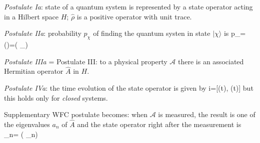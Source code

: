 \documentclass[12pt]{article}
\begin{document}
\emph{Postulate Ia}: state of a quantum system is represented
by a state operator acting in a Hilbert space $H$;
\(\hat{\rho}\) is a positive operator with unit trace.


\emph{Postulate IIa}: probability $p_{\chi}$ of finding the quantum
systen in state $|\chi\rangle$ is 
\be
p_{\chi}=\Tr(\hat{\rho}\op{\chi})=\Tr\left(\hat{\rho} _{\chi}\right)
\ee


\emph{Postulate IIIa} =  Postulate III: to a physical property
$\mathcal{A}$ there is an associated Hermitian operator \(\hat{A}\)
in $H$.

\emph{Postulate IVa}: the time evolution of the state operator
is given by
\be
i\hbar {}=[(t), \hat{\rho}(t)]
\ee
but this holds only for \emph{closed} systems.

Supplementary WFC postulate becomes: when \(\mathcal{A}\) is
measured, the result is one of the eigenvalues $a_n$ of \(\hat{A}\)
and the state operator right after the measurement is
\be
\hat{\rho} \rightarrow \hat{\rho}_{n}=
{\Tr\left(\hat{\rho} _{n}\right)}
\ee
\end{document}
